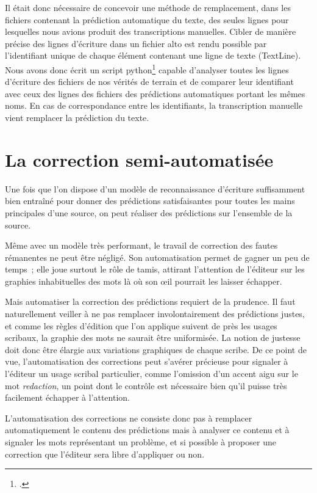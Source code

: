 \documentclass[a4paper,12pt,twoside]{book}
\begin{document}
				Il était donc nécessaire de concevoir une méthode de remplacement, dans les fichiers contenant la prédiction automatique du texte, des seules lignes pour lesquelles nous avions produit des transcriptions manuelles. Cibler de manière précise des lignes d'écriture dans un fichier \gls{alto} est rendu possible par l'identifiant unique de chaque élément contenant une ligne de texte (\textsf{TextLine}). Nous avons donc écrit un script python\footcite{biayInjectTranscriptPy2022a} capable d'analyser toutes les lignes d'écriture des fichiers de nos vérités de terrain et de comparer leur identifiant avec ceux des lignes des fichiers des prédictions automatiques portant les mêmes noms. En cas de correspondance entre les identifiants, la transcription manuelle vient remplacer la prédiction du texte.
			
		\section{La correction semi-automatisée}
			Une fois que l'on dispose d'un modèle de reconnaissance d'écriture suffisamment bien entraîné pour donner des prédictions satisfaisantes pour toutes les mains principales d'une source, on peut réaliser des prédictions sur l'ensemble de la source.
			
			Même avec un modèle très performant, le travail de correction des fautes rémanentes ne peut être négligé. Son automatisation permet de gagner un peu de temps~; elle joue surtout le rôle de tamis, attirant l'attention de l'éditeur sur les graphies inhabituelles des mots là où son œil pourrait les laisser échapper.
			
			Mais automatiser la correction des prédictions requiert de la prudence. Il faut naturellement veiller à ne pas remplacer involontairement des prédictions justes, et comme les règles d'édition que l'on applique suivent de près les usages scribaux, la graphie des mots ne saurait être uniformisée. La notion de justesse doit donc être élargie aux variations graphiques de chaque scribe. De ce point de vue, l'automatisation des corrections peut s'avérer précieuse pour signaler à l'éditeur un usage scribal particulier, comme l'omission d'un accent aigu sur le mot \textit{redaction}, un point dont le contrôle est nécessaire bien qu'il puisse très facilement échapper à l'attention.
			
			L'automatisation des corrections ne consiste donc pas à remplacer automatiquement le contenu des prédictions mais à analyser ce contenu et à signaler les mots représentant un problème, et si possible à proposer une correction que l'éditeur sera libre d'appliquer ou non.
			
\end{document}
